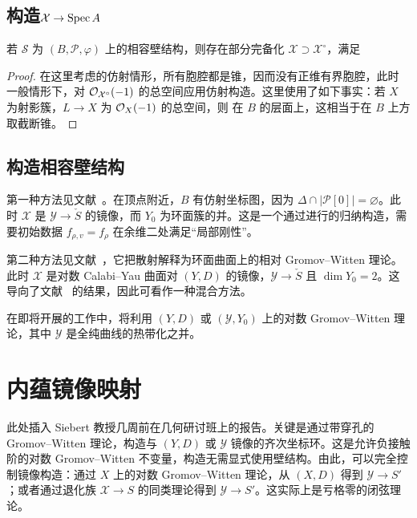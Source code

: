 \subsection{构造\texorpdfstring{$\mathcal X\to\operatorname{Spec} A$}{X→Spec A}}
\begin{theorem}\label{thm:5.7}
若 $\mathscr S$ 为 $(B,\mathscr P,\varphi)$ 上的相容壁结构，则存在部分完备化 $\mathcal X\supset\mathcal X^\circ$，满足
\end{theorem}
\begin{proof}
在这里考虑的仿射情形，所有胞腔都是锥，因而没有正维有界胞腔，此时
一般情形下，对 $\mathcal O_{\mathcal X^\circ}(-1)$ 的总空间应用仿射构造。这里使用了如下事实：若 $X$ 为射影簇，$L\to X$ 为 $\mathcal O_X(-1)$ 的总空间，则
在 $B$ 的层面上，这相当于在 $B$ 上方取截断锥。
\end{proof}
\subsection{构造相容壁结构}
第一种方法见文献~\cite{ref16}。在顶点附近，$B$ 有仿射坐标图，因为 $\Delta\cap|\mathscr P[0]|=\varnothing$。此时 $\mathcal X$ 是 $\mathcal Y\to\check S$ 的镜像，而 $Y_0$ 为环面簇的并。这是一个通过进行的归纳构造，需要初始数据 $f_{\rho,v}=f_\rho$ 在余维二处满足“局部刚性”。

第二种方法见文献~\cite{ref14}，它把散射解释为环面曲面上的相对 Gromov–Witten 理论。此时 $\mathcal X$ 是对数 Calabi–Yau 曲面对 $(Y,D)$ 的镜像，$\mathcal Y\to\check S$ 且 $\dim Y_0=2$。这导向了文献~\cite{ref13} 的结果，因此可看作一种混合方法。

在即将开展的工作中，将利用 $(Y,D)$ 或 $(\mathcal Y,Y_0)$ 上的对数 Gromov–Witten 理论，其中 $\mathcal Y$ 是全纯曲线的热带化之并。
\section{内蕴镜像映射}
此处插入 Siebert 教授几周前在几何研讨班上的报告。关键是通过带穿孔的 Gromov–Witten 理论，构造与 $(Y,D)$ 或 $\mathcal Y$ 镜像的齐次坐标环。这是允许负接触阶的对数 Gromov–Witten 不变量，构造无需显式使用壁结构。由此，可以完全控制镜像构造：通过 $X$ 上的对数 Gromov–Witten 理论，从 $(X,D)$ 得到 $\mathcal Y\to S'$；或者通过退化族 $\mathcal X\to S$ 的同类理论得到 $\mathcal Y\to S'$。这实际上是亏格零的闭弦理论。

